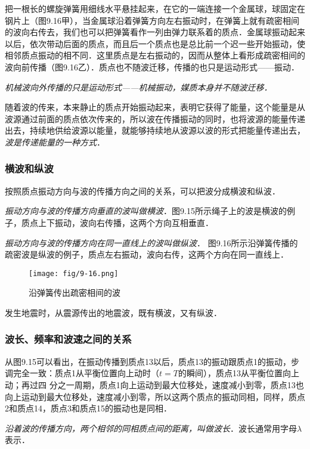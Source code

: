 把一根长的螺旋弹簧用细线水平悬挂起来，在它的一端连接一个金属球，球固定在钢片上（图9.16甲），当金属球沿着弹簧方向左右振动时，在弹簧上就有疏密相间的波向右传去，我们也可以把弹簧看作一列由弹力联系着的质点．金属球振动起来以后，依次带动后面的质点，而且后一个质点也是总比前一个迟一些开始振动，使相邻质点振动的相不同．这里质点是左右振动的，因而从整体上看形成疏密相间的波向前传播（图9.16乙）．质点也不随波迁移，传播的也只是运动形式——振动．

\textit{机械波向外传播的只是运动形式——机械振动，媒质本身并不随波迁移．}

随着波的传来，本来静止的质点开始振动起来，表明它获得了能量，这个能量是从波源通过前面的质点依次传来的，所以波在传播振动的同时，也将波源的能量传递出去，持续地供给波源以能量，就能够持续地从波源以波的形式把能量传递出去，\textit{波是传递能量的一种方式}．

\subsubsection{横波和纵波} 

按照质点振动方向与波的传播方向之间的关系，可以把波分成横波和纵波．

\textit{振动方向与波的传播方向垂直的波叫做横波}．图9.15所示绳子上的波是横波的例子，质点上下振动，波向右传播，这两个方向互相垂直．

\textit{振动方向与波的传播方向在同一直线上的波叫做纵波}．
图9.16所示沿弹簧传播的疏密波是纵波的例子，质点左右振动，波向右传，这两个方向在同一直线上．
\begin{figure}[htp]\centering
\texttt{[image: fig/9-16.png]}
\caption{沿弹簧传出疏密相间的波}
\end{figure}



发生地震时，从震源传出的地震波，既有横波，又有纵波．

\subsubsection{波长、频率和波速之间的关系}

从图9.15可以看出，在振动传播到质点13以后，质点13的振动跟质点1的振动，步调完全一致：质点1从平衡位置向上动时（$t=T$的瞬间），质点13从平衡位置向上动；再过四
分之一周期，质点1向上运动到最大位移处，速度减小到零，质点13也向上运动到最大位移处，速度减小到零，所以这两个质点的振动同相，同样，质点2和质点14，质点3和质点15的振动也是同相．

\textit{沿着波的传播方向，两个相邻的同相质点间的距离，叫做波长}．波长通常用字母$\lambda$表示．


